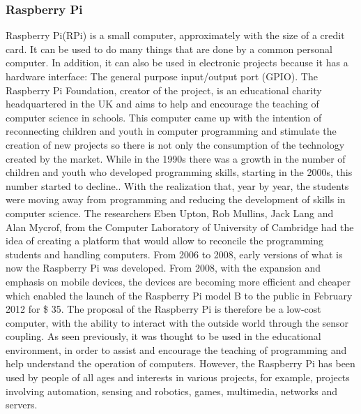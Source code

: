 \documentclass{acm_proc_article-sp}
\begin{document}
\subsubsection{Raspberry Pi}
Raspberry Pi(RPi) is a small computer, approximately with the size of a credit card. It can be used to do many things that are done by a common personal computer\cite{raspberryfoundation}. In addition, it can also be used in electronic projects because it has a hardware interface: The general purpose input/output port (GPIO). The Raspberry Pi Foundation, creator of the project, is an educational charity headquartered in the UK and aims to help and encourage the teaching of computer science in schools.
\newline
\newline
This computer came up with the intention of reconnecting children and youth in computer programming and stimulate the creation of new projects so there is not only the consumption of the technology created by the market. While in the 1990s there was a growth in the number of children and youth who developed programming skills, starting in the 2000s, this number started to decline.\cite{raspberryAbout}.
\newline
\newline
With the realization that, year by year, the students were moving away from programming and reducing the development of skills in computer science. The researchers Eben Upton, Rob Mullins, Jack Lang and Alan Mycrof, from the Computer Laboratory of University of Cambridge had the idea of creating a platform that would allow to reconcile the programming students  and handling computers\cite{dennis2013raspberry}. From 2006 to 2008, early versions of what is now the Raspberry Pi was developed. From 2008, with the expansion and emphasis on mobile devices, the devices are becoming more efficient and cheaper which enabled the launch of the Raspberry Pi model B to the public in February 2012 for \$ 35.
\newline
\newline
The proposal of the Raspberry Pi is therefore be a low-cost computer, with the ability to interact with the outside world through the sensor coupling. As seen previously, it was thought to be used in the educational environment, in order to assist and encourage the teaching of programming and help understand the operation of computers. However, the Raspberry Pi has been used by people of all ages and interests in various projects, for example, projects involving automation, sensing and robotics, games, multimedia, networks and servers.
\end{document}

